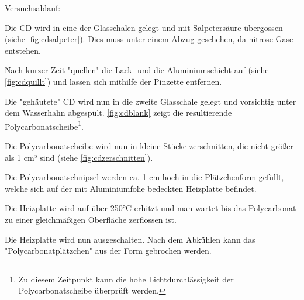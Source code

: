 Versuchsablauf:
\begin{enumerate*}
    \item Die CD wird in eine der Glasschalen gelegt und mit Salpetersäure übergossen (siehe \autoref{fig:cdsalpeter}). Dies muss unter einem Abzug geschehen, da nitrose Gase entstehen.
    \item Nach kurzer Zeit "quellen" die Lack- und die Aluminiumschicht auf (siehe \autoref{fig:cdquillt}) und lassen sich mithilfe der Pinzette entfernen.
    \item Die "gehäutete" CD wird nun in die zweite Glasschale gelegt und vorsichtig unter dem Wasserhahn abgespült. \autoref{fig:cdblank} zeigt die resultierende Polycarbonatscheibe\footnote{Zu diesem Zeitpunkt kann die hohe Lichtdurchlässigkeit der Polycarbonatscheibe überprüft werden.}.
    \item Die Polycarbonatscheibe wird nun in kleine Stücke zerschnitten, die nicht größer als 1 cm² sind (siehe \autoref{fig:cdzerschnitten}).
    \item Die Polycarbonatschnipsel werden ca. 1 cm hoch in die Plätzchenform gefüllt, welche sich auf der mit Aluminiumfolie bedeckten Heizplatte befindet. %
    \item Die Heizplatte wird auf über 250°C erhitzt und man wartet bis das Polycarbonat zu einer gleichmäßigen Oberfläche zerflossen ist.
    \item Die Heizplatte wird nun ausgeschalten. Nach dem Abkühlen kann das "Polycarbonatplätzchen" aus der Form gebrochen werden. %
\end{enumerate*}

